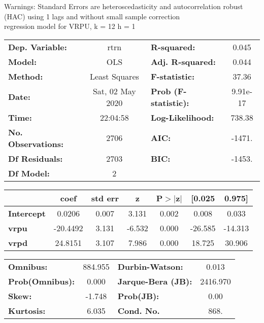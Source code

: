 Warnings: \newline
 [1] Standard Errors are heteroscedasticity and autocorrelation robust (HAC) using 1 lags and without small sample correction\\ 

regression model for VRPU, k = 12 h = 1\begin{center}
\begin{tabular}{lclc}
\toprule
\textbf{Dep. Variable:}    &       rtrn       & \textbf{  R-squared:         } &     0.045   \\
\textbf{Model:}            &       OLS        & \textbf{  Adj. R-squared:    } &     0.044   \\
\textbf{Method:}           &  Least Squares   & \textbf{  F-statistic:       } &     37.36   \\
\textbf{Date:}             & Sat, 02 May 2020 & \textbf{  Prob (F-statistic):} &  9.91e-17   \\
\textbf{Time:}             &     22:04:58     & \textbf{  Log-Likelihood:    } &    738.38   \\
\textbf{No. Observations:} &        2706      & \textbf{  AIC:               } &    -1471.   \\
\textbf{Df Residuals:}     &        2703      & \textbf{  BIC:               } &    -1453.   \\
\textbf{Df Model:}         &           2      & \textbf{                     } &             \\
\bottomrule
\end{tabular}
\begin{tabular}{lcccccc}
                   & \textbf{coef} & \textbf{std err} & \textbf{z} & \textbf{P$> |$z$|$} & \textbf{[0.025} & \textbf{0.975]}  \\
\midrule
\textbf{Intercept} &       0.0206  &        0.007     &     3.131  &         0.002        &        0.008    &        0.033     \\
\textbf{vrpu}      &     -20.4492  &        3.131     &    -6.532  &         0.000        &      -26.585    &      -14.313     \\
\textbf{vrpd}      &      24.8151  &        3.107     &     7.986  &         0.000        &       18.725    &       30.906     \\
\bottomrule
\end{tabular}
\begin{tabular}{lclc}
\textbf{Omnibus:}       & 884.955 & \textbf{  Durbin-Watson:     } &    0.013  \\
\textbf{Prob(Omnibus):} &   0.000 & \textbf{  Jarque-Bera (JB):  } & 2416.970  \\
\textbf{Skew:}          &  -1.748 & \textbf{  Prob(JB):          } &     0.00  \\
\textbf{Kurtosis:}      &   6.035 & \textbf{  Cond. No.          } &     868.  \\
\bottomrule
\end{tabular}
\end{center}

